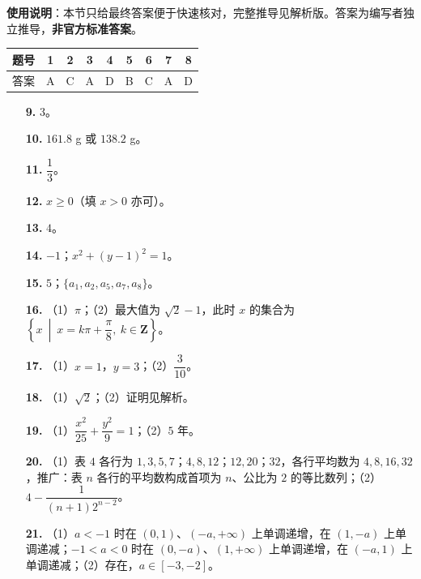 
\begin{gknotice}
\textbf{使用说明}：本节只给最终答案便于快速核对，完整推导见解析版。答案为编写者独立推导，\textbf{非官方标准答案}。
\end{gknotice}

\begin{center}\begin{tabular}{ccccccccc}
\toprule
题号 & 1 & 2 & 3 & 4 & 5 & 6 & 7 & 8 \\
\midrule
答案 & A & C & A & D & B & C & A & D \\
\bottomrule
\end{tabular}\end{center}

\begin{itemize}[leftmargin=2.6em]
  \item[\textbf{9.}] $3$。
  \item[\textbf{10.}] $161.8$ g 或 $138.2$ g。
  \item[\textbf{11.}] $\dfrac13$。
  \item[\textbf{12.}] $x\geqslant0$（填 $x>0$ 亦可）。
  \item[\textbf{13.}] $4$。
  \item[\textbf{14.}] $-1$；$x^2+(y-1)^2=1$。
  \item[\textbf{15.}] $5$；$\{a_1,a_2,a_5,a_7,a_8\}$。
\end{itemize}

\begin{itemize}[leftmargin=2.6em]
  \item[\textbf{16.}] （1）$\pi$；（2）最大值为 $\sqrt2-1$，此时 $x$ 的集合为 $\left\{x\ \middle|\ x=k\pi+\dfrac\pi8,\ k\in\mathbf Z\right\}$。
  \item[\textbf{17.}] （1）$x=1$，$y=3$；（2）$\dfrac3{10}$。
  \item[\textbf{18.}] （1）$\sqrt2$；（2）证明见解析。
  \item[\textbf{19.}] （1）$\dfrac{x^2}{25}+\dfrac{y^2}{9}=1$；（2）$5$ 年。
  \item[\textbf{20.}] （1）表 $4$ 各行为 $1,3,5,7$；$4,8,12$；$12,20$；$32$，各行平均数为 $4,8,16,32$，推广：表 $n$ 各行的平均数构成首项为 $n$、公比为 $2$ 的等比数列；（2）$4-\dfrac{1}{(n+1)2^{n-2}}$。
  \item[\textbf{21.}] （1）$a<-1$ 时在 $(0,1)$、$(-a,+\infty)$ 上单调递增，在 $(1,-a)$ 上单调递减；$-1<a<0$ 时在 $(0,-a)$、$(1,+\infty)$ 上单调递增，在 $(-a,1)$ 上单调递减；（2）存在，$a\in[-3,-2]$。
\end{itemize}
